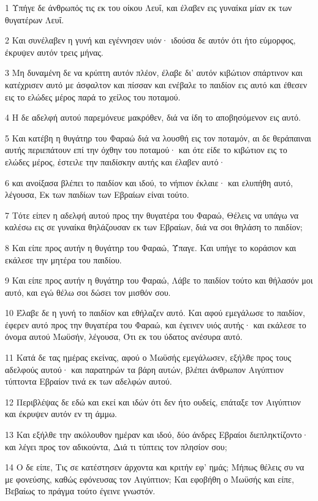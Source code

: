 \par 1 Υπήγε δε άνθρωπός τις εκ του οίκου Λευΐ, και έλαβεν εις γυναίκα μίαν εκ των θυγατέρων Λευΐ.
\par 2 Και συνέλαβεν η γυνή και εγέννησεν υιόν· ιδούσα δε αυτόν ότι ήτο εύμορφος, έκρυψεν αυτόν τρεις μήνας.
\par 3 Μη δυναμένη δε να κρύπτη αυτόν πλέον, έλαβε δι' αυτόν κιβώτιον σπάρτινον και κατέχρισεν αυτό με άσφαλτον και πίσσαν και ενέβαλε το παιδίον εις αυτό και έθεσεν εις το ελώδες μέρος παρά το χείλος του ποταμού.
\par 4 Η δε αδελφή αυτού παρεμόνευε μακρόθεν, διά να ίδη το αποβησόμενον εις αυτό.
\par 5 Και κατέβη η θυγάτηρ του Φαραώ διά να λουσθή εις τον ποταμόν, αι δε θεράπαιναι αυτής περιεπάτουν επί την όχθην του ποταμού· και ότε είδε το κιβώτιον εις το ελώδες μέρος, έστειλε την παιδίσκην αυτής και έλαβεν αυτό·
\par 6 και ανοίξασα βλέπει το παιδίον και ιδού, το νήπιον έκλαιε· και ελυπήθη αυτό, λέγουσα, Εκ των παιδίων των Εβραίων είναι τούτο.
\par 7 Τότε είπεν η αδελφή αυτού προς την θυγατέρα του Φαραώ, Θέλεις να υπάγω να καλέσω εις σε γυναίκα θηλάζουσαν εκ των Εβραίων, διά να σοι θηλάση το παιδίον;
\par 8 Και είπε προς αυτήν η θυγάτηρ του Φαραώ, Ύπαγε. Και υπήγε το κοράσιον και εκάλεσε την μητέρα του παιδίου.
\par 9 Και είπε προς αυτήν η θυγάτηρ του Φαραώ, Λάβε το παιδίον τούτο και θήλασόν μοι αυτό, και εγώ θέλω σοι δώσει τον μισθόν σου.
\par 10 Έλαβε δε η γυνή το παιδίον και εθήλαζεν αυτό. Και αφού εμεγάλωσε το παιδίον, έφερεν αυτό προς την θυγατέρα του Φαραώ, και έγεινεν υιός αυτής· και εκάλεσε το όνομα αυτού Μωϋσήν, λέγουσα, Ότι εκ του ύδατος ανέσυρα αυτό.
\par 11 Κατά δε τας ημέρας εκείνας, αφού ο Μωϋσής εμεγάλωσεν, εξήλθε προς τους αδελφούς αυτού· και παρατηρών τα βάρη αυτών, βλέπει άνθρωπον Αιγύπτιον τύπτοντα Εβραίον τινά εκ των αδελφών αυτού.
\par 12 Περιβλέψας δε εδώ και εκεί και ιδών ότι δεν ήτο ουδείς, επάταξε τον Αιγύπτιον και έκρυψεν αυτόν εν τη άμμω.
\par 13 Και εξήλθε την ακόλουθον ημέραν και ιδού, δύο άνδρες Εβραίοι διεπληκτίζοντο· και λέγει προς τον αδικούντα, Διά τι τύπτεις τον πλησίον σου;
\par 14 Ο δε είπε, Τις σε κατέστησεν άρχοντα και κριτήν εφ' ημάς; Μήπως θέλεις συ να με φονεύσης, καθώς εφόνευσας τον Αιγύπτιον; Και εφοβήθη ο Μωϋσής και είπε, Βεβαίως το πράγμα τούτο έγεινε γνωστόν.
